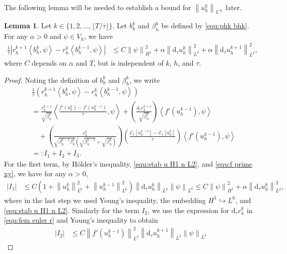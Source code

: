 \documentclass[11pt, reqno]{amsart}
\theoremstyle{definition}
\newtheorem{lemma}[theorem]{Lemma}
\numberwithin{equation}{section}
\newcommand{\dtt}{\mathrm{d}_\tau}
\newcommand{\norm}[2]{\left\|{#1}\right\|_{#2}}
\newcommand{\inpro}[2]{\left\langle#1,#2\right\rangle}
\newcommand{\abs}[1]{\left|{#1}\right|}
\begin{document}
The following lemma will be needed to establish a bound for $\norm{u_h^k}{L^\infty}$ later.

\begin{lemma}
Let $k \in \{1,2,\ldots,\lfloor T/\tau \rfloor\}$. Let $b_h^k$ and $\beta_h^k$ be defined by \eqref{equ:phk bhk}. For any $\alpha>0$ and $\psi\in V_h$, we have
\begin{align}\label{equ:ineq rhk f}
	\frac{1}{\tau} \left|r_h^{k+1} \inpro{b_h^k}{\psi}
	-
	r_h^k \inpro{b_h^{k-1}}{\psi} \right| 
	&\leq 
	C\norm{\psi}{H^1}^2 + \alpha \norm{\dtt u_h^k}{L^2}^2
	+ \alpha \norm{\dtt u_h^{k+1}}{L^2}^2,
\end{align}
where $C$ depends on $\alpha$ and $T$, but is independent of $k$, $h$, and $\tau$.
\end{lemma}

\begin{proof}
Noting the definition of $b_h^k$ and $\beta_h^k$, we write
\begin{align}\label{equ:1tau k I}
	&\frac{1}{\tau} \left(r_h^{k+1} \inpro{b_h^k}{\psi}
	-
	r_h^k \inpro{b_h^{k-1}}{\psi} \right)
	\nonumber\\
	&=
	\frac{r_h^{k+1}}{\sqrt{\beta_h^k}} \inpro{\frac{f'(u_h^k)-f'(u_h^{k-1})}{\tau}}{\psi}
	+
	\left(\frac{\dtt r_h^{k+1}}{\sqrt{\beta_h^k}} \right)  \inpro{f'(u_h^{k-1})}{\psi}
	\nonumber\\
	&\quad
	+
	\left(\frac{r_h^k}{\sqrt{\beta_h^{k-1} \beta_h^k} \left(\sqrt{\beta_h^{k-1}} + \sqrt{\beta_h^k} \right)} \right)
	\left(\frac{\mathcal{E}_1[u_h^{k-1}]- \mathcal{E}_1[u_h^k]}{\tau}\right) 
	\inpro{f'(u_h^{k-1})}{\psi}
	\nonumber\\
	&=:I_1+I_2+I_3.
\end{align}
For the first term, by H\"older's inequality, \eqref{equ:stab u H1 n L2}, and \eqref{equ:f prime xy}, we have for any $\alpha>0$,
\begin{align}\label{equ:I1 tau}
	\abs{I_1}
	&\leq
	C \left(1+\norm{u_h^k}{L^6}^2 + \norm{u_h^{k-1}}{L^6}^2\right) \norm{\dtt u_h^k}{L^2} \norm{\psi}{L^6}
	\leq
	C\norm{\psi}{H^1}^2 + \alpha \norm{\dtt u_h^k}{L^2}^2,
\end{align}
where in the last step we used Young's inequality, the embedding $H^1\hookrightarrow L^6$, and \eqref{equ:stab u H1 n L2}. Similarly for the term $I_2$, we use the expression for $\dtt r_h^k$ in \eqref{equ:fem euler r} and Young's inequality to obtain
\begin{align}\label{equ:I2 tau}
	\abs{I_2}
	&\leq
	C \norm{f'(u_h^{k-1})}{L^2}^2 \norm{\dtt u_h^{k+1}}{L^2} \norm{\psi}{L^2}

\end{align}
\end{proof}
\end{document}

